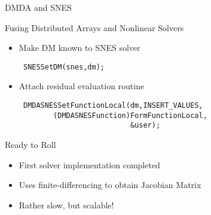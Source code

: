 \begin{frame}[fragile]{DMDA and SNES}
 
  \begin{block}{Fusing Distributed Arrays and Nonlinear Solvers}
   \begin{itemize}
    \item Make DM known to SNES solver
      \begin{lstlisting}
 SNESSetDM(snes,dm);
      \end{lstlisting}

    \item Attach residual evaluation routine
      \begin{lstlisting}
 DMDASNESSetFunctionLocal(dm,INSERT_VALUES,
        (DMDASNESFunction)FormFunctionLocal,
                          &user);
      \end{lstlisting}
   \end{itemize}
  \end{block}

  \begin{block}{Ready to Roll}
   \begin{itemize}
    \item First solver implementation completed
    \item Uses finite-differencing to obtain Jacobian Matrix
    \item Rather slow, but scalable!
   \end{itemize}
  \end{block}

 
\end{frame}
